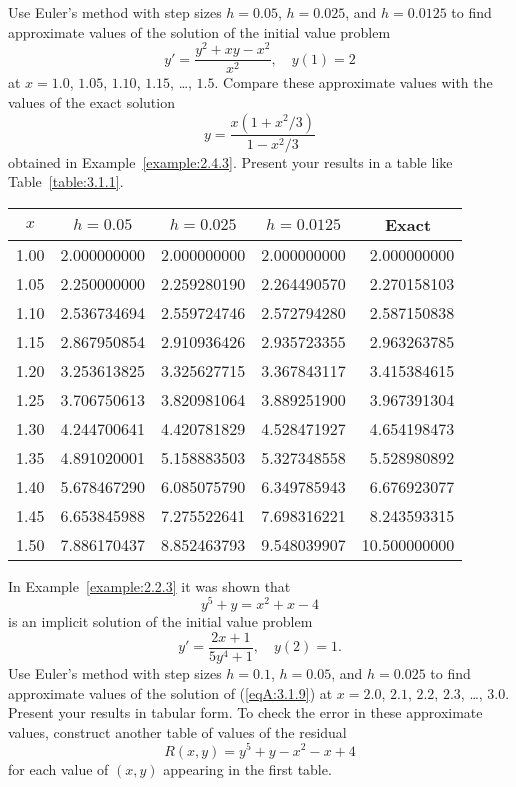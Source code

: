 \documentclass{ximera}
\begin{document}
\begin{problem}\label{exer:3.1.8} 
Use Euler's method with step sizes $h=0.05$, $h=0.025$, and $h=0.0125$ to
find approximate values of the solution of the initial value problem
$$
y'=\frac{y^2+xy-x^2}{x^2},\quad y(1)=2
$$
at $x=1.0$, $1.05$, $1.10$, $1.15$, \dots, $1.5$. Compare these approximate values with the values of the exact solution
$$
y=\frac{x(1+x^2/3)}{1-x^2/3}
$$
obtained in Example~\ref{example:2.4.3}. Present your results in a table like Table~\ref{table:3.1.1}.



\begin{solution}
    {\small
\begin{tabular}{|c|r|r|r|r|}\hline
\multicolumn{1}{|c|}{$x$}&
\multicolumn{1}{|c|}{$h=0.05$}&
\multicolumn{1}{|c|}{$h=0.025$}&
\multicolumn{1}{|c|}{$h=0.0125$}&
\multicolumn{1}{|c|}{Exact}\\ \hline
1.00 &  2.000000000 & 2.000000000 & 2.000000000 &  2.000000000 \\
1.05 &  2.250000000 & 2.259280190 & 2.264490570 &  2.270158103 \\
1.10 &  2.536734694 & 2.559724746 & 2.572794280 &  2.587150838 \\
1.15 &  2.867950854 & 2.910936426 & 2.935723355 &  2.963263785 \\
1.20 &  3.253613825 & 3.325627715 & 3.367843117 &  3.415384615 \\
1.25 &  3.706750613 & 3.820981064 & 3.889251900 &  3.967391304 \\
1.30 &  4.244700641 & 4.420781829 & 4.528471927 &  4.654198473 \\
1.35 &  4.891020001 & 5.158883503 & 5.327348558 &  5.528980892 \\
1.40 &  5.678467290 & 6.085075790 & 6.349785943 &  6.676923077 \\
1.45 &  6.653845988 & 7.275522641 & 7.698316221 &  8.243593315 \\
1.50 &  7.886170437 & 8.852463793 & 9.548039907 & 10.500000000 \\
\hline
\end{tabular}}
\end{solution}
\end{problem}

\begin{problem}\label{exer:3.1.9} 
In Example~\ref{example:2.2.3} it was shown that
$$
y^5+y=x^2+x-4
$$
is an implicit solution of  the initial value problem
\begin{equation}\label{eqA:3.1.9}
y'=\frac{2x+1}{5y^4+1},\quad y(2)=1.
\end{equation}
Use Euler's method with step sizes $h=0.1$, $h=0.05$, and $h=0.025$ to
find approximate values of the solution of (\ref{eqA:3.1.9}) at
$x=2.0$, $2.1$, $2.2$, $2.3$, \dots, $3.0$. Present your results in tabular form.
To check the error in these approximate values, construct another table of values of the residual
$$
  R(x,y)=y^5+y-x^2-x+4
$$
for each value of $(x,y)$ appearing in the first table.
\end{problem}
\end{document}
